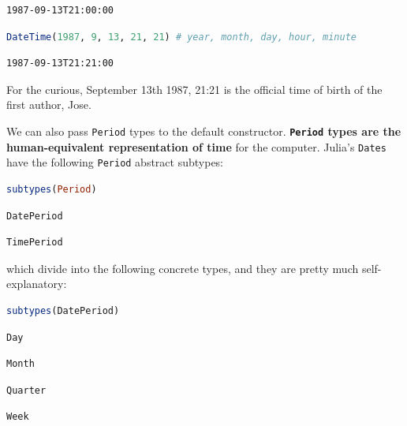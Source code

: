 \documentclass[
  notoc %
]{tufte-book}
\newcommand{\passthrough}[1]{#1}
\begin{document}
\begin{lstlisting}[language=Output]
1987-09-13T21:00:00
\end{lstlisting}

\begin{lstlisting}[language=Julia]
DateTime(1987, 9, 13, 21, 21) # year, month, day, hour, minute
\end{lstlisting}

\begin{lstlisting}[language=Output]
1987-09-13T21:21:00
\end{lstlisting}

For the curious, September 13th 1987, 21:21 is the official time of
birth of the first author, Jose.

We can also pass \passthrough{\lstinline!Period!} types to the default
constructor. \textbf{\passthrough{\lstinline!Period!} types are the
human-equivalent representation of time} for the computer. Julia's
\passthrough{\lstinline!Dates!} have the following
\passthrough{\lstinline!Period!} abstract subtypes:

\begin{lstlisting}[language=Julia]
subtypes(Period)
\end{lstlisting}

\begin{lstlisting}[language=Output]
DatePeriod
\end{lstlisting}

\begin{lstlisting}[language=Output]
TimePeriod
\end{lstlisting}

which divide into the following concrete types, and they are pretty much
self-explanatory:

\begin{lstlisting}[language=Julia]
subtypes(DatePeriod)
\end{lstlisting}

\begin{lstlisting}[language=Output]
Day
\end{lstlisting}

\begin{lstlisting}[language=Output]
Month
\end{lstlisting}

\begin{lstlisting}[language=Output]
Quarter
\end{lstlisting}

\begin{lstlisting}[language=Output]
Week
\end{lstlisting}
\end{document}

